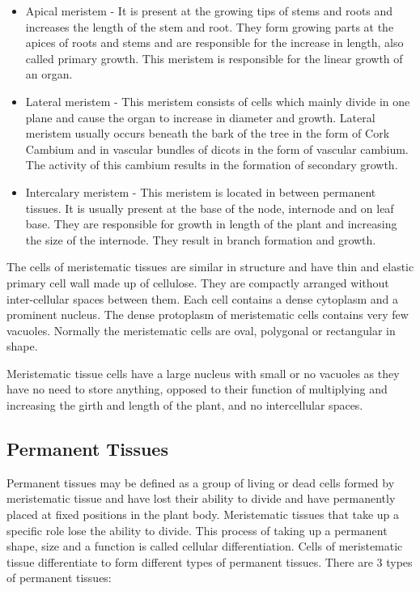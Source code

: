 \begin{itemize}
\tightlist
\item
  Apical meristem - It is present at the growing tips of stems and roots and increases the length of the stem and root. They form growing parts at the apices of roots and stems and are responsible for the increase in length, also called primary growth. This meristem is responsible for the linear growth of an organ.
\item
  Lateral meristem - This meristem consists of cells which mainly divide in one plane and cause the organ to increase in diameter and growth. Lateral meristem usually occurs beneath the bark of the tree in the form of Cork Cambium and in vascular bundles of dicots in the form of vascular cambium. The activity of this cambium results in the formation of secondary growth.
\item
  Intercalary meristem - This meristem is located in between permanent tissues. It is usually present at the base of the node, internode and on leaf base. They are responsible for growth in length of the plant and increasing the size of the internode. They result in branch formation and growth.
\end{itemize}

The cells of meristematic tissues are similar in structure and have thin and elastic primary cell wall made up of cellulose. They are compactly arranged without inter-cellular spaces between them. Each cell contains a dense cytoplasm and a prominent nucleus. The dense protoplasm of meristematic cells contains very few vacuoles. Normally the meristematic cells are oval, polygonal or rectangular in shape.

Meristematic tissue cells have a large nucleus with small or no vacuoles as they have no need to store anything, opposed to their function of multiplying and increasing the girth and length of the plant, and no intercellular spaces.

\hypertarget{permanent-tissues}{%
\subsection{Permanent Tissues}\label{permanent-tissues}}

Permanent tissues may be defined as a group of living or dead cells formed by meristematic tissue and have lost their ability to divide and have permanently placed at fixed positions in the plant body. Meristematic tissues that take up a specific role lose the ability to divide. This process of taking up a permanent shape, size and a function is called cellular differentiation. Cells of meristematic tissue differentiate to form different types of permanent tissues. There are 3 types of permanent tissues:

